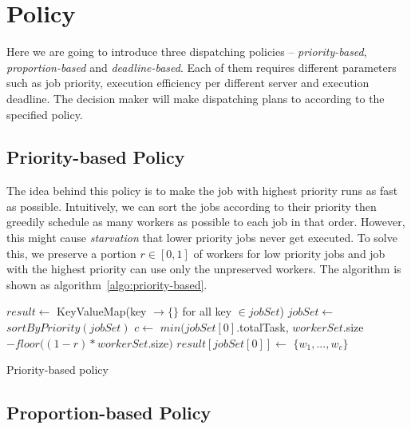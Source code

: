 \chapter{Policy}

Here we are going to introduce three dispatching policies --
\emph{priority-based}, \emph{proportion-based} and
\emph{deadline-based}.
Each of them requires different parameters such as job priority,
execution efficiency per different server and execution deadline.
The decision maker will make dispatching plans to according to the
specified policy.


\section{Priority-based Policy}

The idea behind this policy is to make the job with highest priority
runs as fast as possible.
Intuitively, we can sort the jobs according to their priority then
greedily schedule as many workers as possible to each job in that order.
However, this might cause \emph{starvation} that lower priority jobs
never get executed.
To solve this, we preserve a portion $r \in [0,1]$ of workers for low
priority jobs and job with the highest priority can use only the
unpreserved workers.
The algorithm is shown as algorithm~\ref{algo:priority-based}.

\begin{algorithm}
  \DontPrintSemicolon %
  $result \gets$
  KeyValueMap(key $\to \{\}$ for all key $\in jobSet$)\;
  $jobSet \gets$ $sortByPriority(jobSet)$\;
  $c \gets$ $min(jobSet[0]$.totalTask, $workerSet$.size$-floor((1-r) *
      workerSet.$size$)$\;
  $result[jobSet[0]] \gets$ $\{w_1, ..., w_c\}$\;
  \;
  \caption{Priority-based policy}
  \label{algo:priority-based}
\end{algorithm}

\section{Proportion-based Policy}

